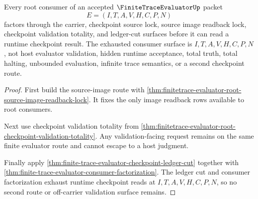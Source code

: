 \begin{theorem}
\label{thm:finitetrace-evaluator-root-consumer-nonescape-exhaustion}
Every root consumer of an accepted $\FiniteTraceEvaluatorUp$ packet
$$
E=(I,T,A,V,H,C,P,N)
$$
factors through the carrier, checkpoint source lock, source image readback lock, checkpoint validation totality, and ledger-cut surfaces before it can read a runtime checkpoint result. The exhausted consumer surface is $I,T,A,V,H,C,P,N$, not host evaluator validation, hidden runtime acceptance, total truth, total halting, unbounded evaluation, infinite trace semantics, or a second checkpoint route.
\end{theorem}
\begin{proof}
First build the source-image route with \autoref{thm:finitetrace-evaluator-root-source-image-readback-lock}. It fixes the only image readback rows available to root consumers.

Next use checkpoint validation totality from \autoref{thm:finitetrace-evaluator-root-checkpoint-validation-totality}. Any validation-facing request remains on the same finite evaluator route and cannot escape to a host judgment.

Finally apply \autoref{thm:finite-trace-evaluator-checkpoint-ledger-cut} together with \autoref{thm:finite-trace-evaluator-consumer-factorization}. The ledger cut and consumer factorization exhaust runtime checkpoint reads at $I,T,A,V,H,C,P,N$, so no second route or off-carrier validation surface remains.
\end{proof}
